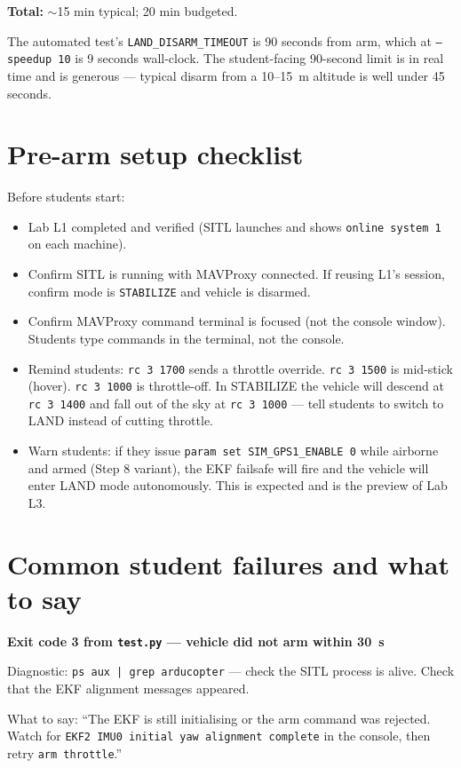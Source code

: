 \documentclass[a4paper,11pt,twoside]{article}
\begin{document}
\textbf{Total:} $\sim$15 min typical; 20 min budgeted.

The automated test's \texttt{LAND\_DISARM\_TIMEOUT} is 90 seconds from arm, which at \texttt{--speedup 10} is 9 seconds wall-clock. The student-facing 90-second limit is in real time and is generous --- typical disarm from a 10--15~m altitude is well under 45 seconds.

\section*{Pre-arm setup checklist}

Before students start:
\begin{itemize}[label={[ ]}]
  \item Lab L1 completed and verified (SITL launches and shows \texttt{online system 1} on each machine).
  \item Confirm SITL is running with MAVProxy connected. If reusing L1's session, confirm mode is \texttt{STABILIZE} and vehicle is disarmed.
  \item Confirm MAVProxy command terminal is focused (not the console window). Students type commands in the terminal, not the console.
  \item Remind students: \texttt{rc 3 1700} sends a throttle override. \texttt{rc 3 1500} is mid-stick (hover). \texttt{rc 3 1000} is throttle-off. In STABILIZE the vehicle will descend at \texttt{rc 3 1400} and fall out of the sky at \texttt{rc 3 1000} --- tell students to switch to LAND instead of cutting throttle.
  \item Warn students: if they issue \texttt{param set SIM\_GPS1\_ENABLE 0} while airborne and armed (Step 8 variant), the EKF failsafe will fire and the vehicle will enter LAND mode autonomously. This is expected and is the preview of Lab L3.
\end{itemize}

\section*{Common student failures and what to say}

\textbf{Exit code 3 from \texttt{test.py} --- vehicle did not arm within 30~s}

Diagnostic: \texttt{ps aux | grep arducopter} --- check the SITL process is alive. Check that the EKF alignment messages appeared.

What to say: ``The EKF is still initialising or the arm command was rejected. Watch for \texttt{EKF2 IMU0 initial yaw alignment complete} in the console, then retry \texttt{arm throttle}.''
\end{document}
